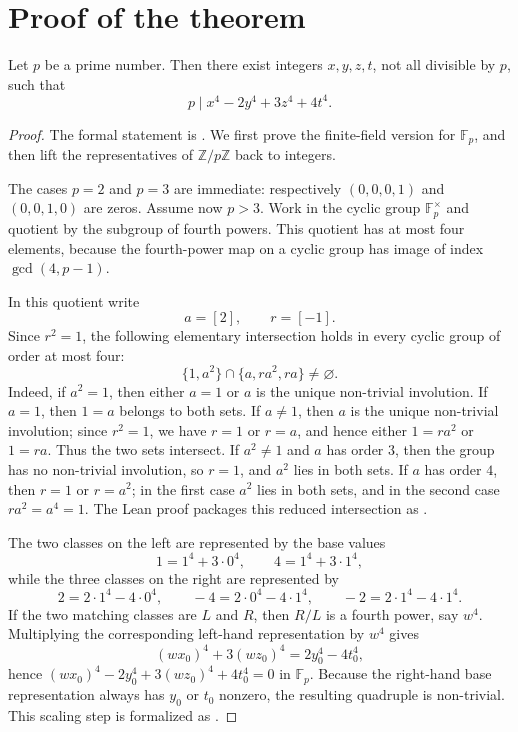 
\section{Proof of the theorem}

\begin{theorem}
Let \(p\) be a prime number. Then there exist integers \(x,y,z,t\), not all divisible by \(p\), such that
\[
p \mid x^4 - 2y^4 + 3z^4 + 4t^4.
\]
\end{theorem}

\begin{proof}
The formal statement is .  We first prove the finite-field version
 for \(\mathbb F_p\), and then lift the representatives of
\(\mathbb Z/p\mathbb Z\) back to integers.

The cases \(p=2\) and \(p=3\) are immediate: respectively \((0,0,0,1)\) and \((0,0,1,0)\) are zeros.  Assume now
\(p>3\).  Work in the cyclic group \(\mathbb F_p^\times\) and quotient by the subgroup of fourth powers.  This quotient
has at most four elements, because the fourth-power map on a cyclic group has image of index
\(\gcd(4,p-1)\).

In this quotient write
\[
a=[2],\qquad r=[-1].
\]
Since \(r^2=1\), the following elementary intersection holds in every cyclic group of order at most four:
\[
\{1,a^2\}\cap \{a,ra^2,ra\}\ne\varnothing.
\]
Indeed, if \(a^2=1\), then either \(a=1\) or \(a\) is the unique non-trivial involution.  If \(a=1\), then
\(1=a\) belongs to both sets.  If \(a\ne 1\), then \(a\) is the unique non-trivial involution; since \(r^2=1\),
we have \(r=1\) or \(r=a\), and hence either \(1=ra^2\) or \(1=ra\).  Thus the two sets intersect.  If
\(a^2\ne 1\) and \(a\) has order \(3\), then the group has no non-trivial involution, so \(r=1\), and \(a^2\)
lies in both sets.  If \(a\) has order \(4\), then \(r=1\) or \(r=a^2\); in the first case \(a^2\) lies in both
sets, and in the second case \(ra^2=a^4=1\).  The Lean proof packages this reduced intersection as
.

The two classes on the left are represented by the base values
\[
1=1^4+3\cdot0^4,\qquad
4=1^4+3\cdot1^4,
\]
while the three classes on the right are represented by
\[
2=2\cdot1^4-4\cdot0^4,\qquad
-4=2\cdot0^4-4\cdot1^4,\qquad
-2=2\cdot1^4-4\cdot1^4.
\]
If the two matching classes are \(L\) and \(R\), then \(R/L\) is a fourth power, say \(w^4\).  Multiplying the
corresponding left-hand representation by \(w^4\) gives
\[
(wx_0)^4+3(wz_0)^4=2y_0^4-4t_0^4,
\]
hence \( (wx_0)^4-2y_0^4+3(wz_0)^4+4t_0^4=0\) in \(\mathbb F_p\).  Because the right-hand base representation
always has \(y_0\) or \(t_0\) nonzero, the resulting quadruple is non-trivial.  This scaling step is formalized as
.
\end{proof}
